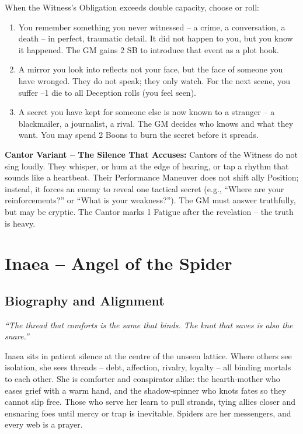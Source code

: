 \documentclass[10pt,a5paper]{book}
\begin{document}
When the Witness’s Obligation exceeds double capacity, choose or roll:
\begin{enumerate}
    \item You remember something you never witnessed – a crime, a conversation, a death – in perfect, traumatic detail. It did not happen to you, but you know it happened. The GM gains 2 SB to introduce that event as a plot hook.
    \item A mirror you look into reflects not your face, but the face of someone you have wronged. They do not speak; they only watch. For the next scene, you suffer –1 die to all Deception rolls (you feel seen).
    \item A secret you have kept for someone else is now known to a stranger – a blackmailer, a journalist, a rival. The GM decides who knows and what they want. You may spend 2 Boons to burn the secret before it spreads.
\end{enumerate}

\noindent \textbf{Cantor Variant – The Silence That Accuses:}
Cantors of the Witness do not sing loudly. They whisper, or hum at the edge of hearing, or tap a rhythm that sounds like a heartbeat. Their Performance Maneuver does not shift ally Position; instead, it forces an enemy to reveal one tactical secret (e.g., “Where are your reinforcements?” or “What is your weakness?”). The GM must answer truthfully, but may be cryptic. The Cantor marks 1 Fatigue after the revelation – the truth is heavy.

\clearpage

\section{Inaea – Angel of the Spider}
\label{patron:inae}

\subsection*{Biography and Alignment}

\textit{“The thread that comforts is the same that binds. The knot that saves is also the snare.”}

Inaea sits in patient silence at the centre of the unseen lattice. Where others see isolation, she sees threads – debt, affection, rivalry, loyalty – all binding mortals to each other. She is comforter and conspirator alike: the hearth‑mother who eases grief with a warm hand, and the shadow‑spinner who knots fates so they cannot slip free. Those who serve her learn to pull strands, tying allies closer and ensnaring foes until mercy or trap is inevitable. Spiders are her messengers, and every web is a prayer.
\end{document}

